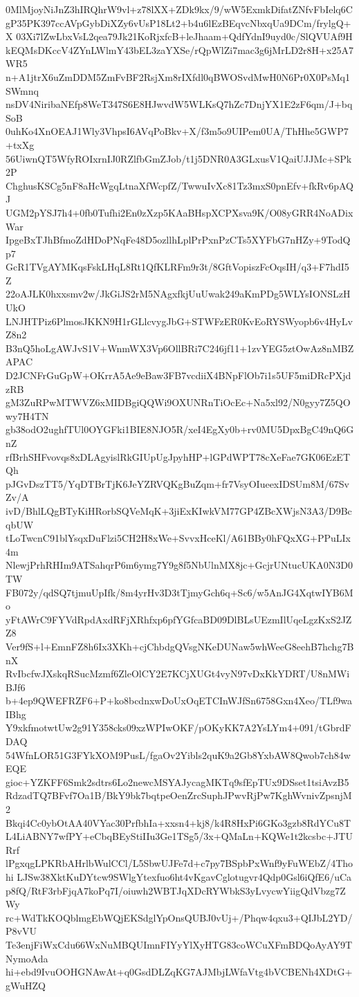 0MlMjoyNiJnZ3hIRQhrW9vl+z78lXX+ZDk9kx/9/wW5ExmkDifatZNfvFbIelq6C
gP35PK397ccAVpGybDiXZy6vUsP18Lt2+b4u6lEzBEqvcNbxqUa9DCm/frylgQ+X
03Xi7lZwLbxVsL2qea79Jk21KoRjxfcB+leJhaam+QdfYdnI9uyd0c/SlQVUAf9H
kEQMsDKccV4ZYnLWlmY43bEL3zaYXSe/rQpWlZi7mac3g6jMrLD2r8H+x25A7WR5
n+A1jtrX6uZmDDM5ZmFvBF2RsjXm8rIXfdl0qBWOSvdMwH0N6Pr0X0PsMq1SWmnq
nsDV4NiribaNEfp8WeT347S6E8HJwvdW5WLKsQ7hZc7DnjYX1E2zF6qm/J+bqSoB
0uhKo4XnOEAJ1Wly3VhpsI6AVqPoBkv+X/f3m5o9UIPem0UA/ThHhe5GWP7+txXg
56UiwnQT5WfyROIxrnIJ0RZlfbGmZJob/t1j5DNR0A3GLxusV1QaiUJJMc+SPk2P
ChghusKSCg5nF8aHcWgqLtnaXfWcpfZ/TwwuIvXc81Tz3mxS0pnEfv+fkRv6pAQJ
UGM2pYSJ7h4+0fb0Tufhi2En0zXzp5KAaBHspXCPXsva9K/O08yGRR4NoADixWar
IpgeBxTJhBfmoZdHDoPNqFe48D5ozllhLplPrPxnPzCTs5XYFbG7nHZy+9TodQp7
GcR1TVgAYMKqsFskLHqL8Rt1QfKLRFm9r3t/8GftVopiszFcOqsIH/q3+F7hdI5Z
22oAJLK0hxxsmv2w/JkGiJS2rM5NAgxfkjUuUwak249aKmPDg5WLYsIONSLzHUkO
LNJHTPiz6PlmosJKKN9H1rGLlcvygJbG+STWFzER0KvEoRYSWyopb6v4HyLvZ8n2
B3nQ5hoLgAWJvS1V+WnmWX3Vp6OllBRi7C246jf11+1zvYEG5ztOwAz8nMBZAPAC
D2JCNFrGuGpW+OKrrA5Ae9eBaw3FB7vcdiiX4BNpFlOb7i1s5UF5miDRcPXjdzRB
gM3ZuRPwMTWVZ6xMIDBgiQQWi9OXUNRnTiOcEc+Na5xl92/N0gyy7Z5QOwy7H4TN
gb38odO2ughfTUl0OYGFki1BIE8NJO5R/xeI4EgXy0b+rv0MU5DpxBgC49nQ6GnZ
rfBrhSHFvovqs8xDLAgyislRkGIUpUgJpyhHP+lGPdWPT78cXeFae7GK06EzETQh
pJGvDszTT5/YqDTBrTjK6JeYZRVQKgBuZqm+fr7VsyOIueexIDSUm8M/67SvZv/A
ivD/BhlLQgBTyKiHRorbSQVeMqK+3jiExKIwkVM77GP4ZBcXWjsN3A3/D9BcqbUW
tLoTwcnC91blYsqxDuFlzi5CH2H8xWe+SvvxHceKl/A61BBy0hFQxXG+PPuLIx4m
NlewjPrhRHIm9ATSahqrP6m6ymg7Y9g8f5NbUlnMX8jc+GcjrUNtucUKA0N3D0TW
FB072y/qdSQ7tjmuUpIfk/8m4yrHv3D3tTjmyGch6q+Sc6/w5AnJG4XqtwIYB6Mo
yFtAWrC9FYVdRpdAxdRFjXRhfxp6pfYGfcaBD09DlBLsUEzmIlUqeLgzKxS2JZZ8
Ver9fS+l+EmnFZ8h6Ix3XKh+cjChbdgQVsgNKeDUNaw5whWeeG8eehB7hchg7BnX
RvIbcfwJXskqRSucMzmf6ZleOlCY2E7KCjXUGt4vyN97vDxKkYDRT/U8nMWiBJf6
b+4ep9QWEFRZF6+P+ko8bcdnxwDoUxOqETCInWJfSn6758Gxn4Xeo/TLf9waIBhg
Y9xkfmotwtUw2g91Y358cks09xzWPIwOKF/pOKyKK7A2YsLYm4+091/tGbrdFDAQ
54WfnLOR51G3FYkXOM9PusL/fgaOv2Yibls2quK9a2Gb8YxbAW8Qwob7ch84wEQE
gioc+YZKFF6Smk2sdtrs6Lo2newcMSYAJycagMKTq9sfEpTUx9DSset1tsiAvzB5
RdzadTQ7BFvf7Oa1B/BkY9bk7bqtpeOenZrcSuphJPwvRjPw7KghWvnivZpsnjM2
Bkqi4Cc0ybOtAA40VYac30PrfbhIa+xxsn4+kj8/k4R8HxPi6GKo3gzb8RdYCu8T
L4LiABNY7wfPY+eCbqBEyStiIIu3Ge1TSg5/3x+QMaLn+KQWe1t2kcsbc+JTURrf
lPgxqgLPKRbAHrlbWulCCl/L5SbwUJFe7d+c7py7BSpbPxWnf9yFuWEbZ/4Thohi
LJSw38XktKuDYtcw9SWlgYtexfuo6ht4vKgavCglotugvr4Qdp0Gsl6iQfE6/uCa
p8fQ/RtF3rbFjqA7koPq7I/oiuwh2WBTJqXDcRYWbkS3yLvycwYiigQdVbzg7ZWy
rc+WdTkKOQblmgEbWQjEKSdglYpOnsQUBJ0vUj+/Phqw4qxu3+QIJbL2YD/P8vVU
Te3enjFiWxCdu66WxNuMBQUImnFIYyYlXyHTG83coWCuXFmBDQoAyAY9TNymoAda
hi+ebd9IvuOOHGNAwAt+q0GsdDLZqKG7AJMbjLWfaVtg4bVCBENh4XDtG+gWuHZQ
